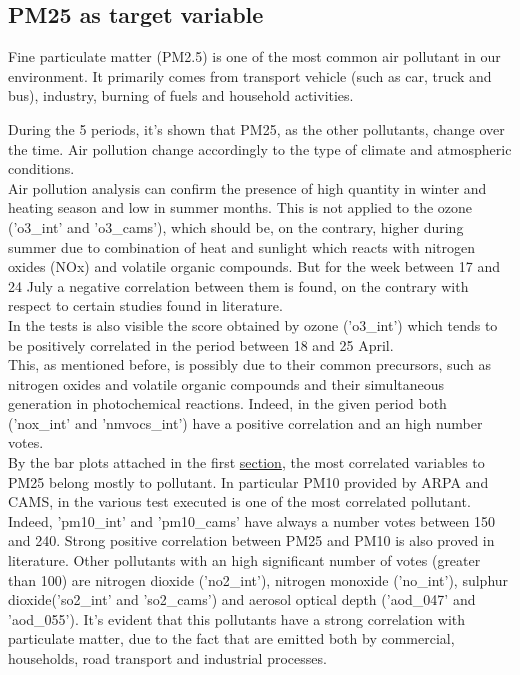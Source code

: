 \subsection{PM25 as target variable}
Fine particulate matter (PM2.5) is one of the most common air pollutant in our environment. 
It primarily comes from transport vehicle (such as car, truck and bus), industry, burning of fuels and household activities.\\ \par
During the 5 periods, it's shown that PM25, as the other pollutants, change over the time. Air pollution change accordingly to the type of climate and atmospheric conditions.\\
Air pollution analysis can confirm the presence of high quantity in winter and heating season and low in summer months\cite{cichowicz2017dispersion}. This is not applied to the ozone ('o3\_int' and 'o3\_cams'), which should be, on the contrary, higher during summer due to combination of heat and sunlight which reacts with nitrogen oxides (NOx) and volatile organic compounds. But for the week between 17 and 24 July a negative correlation between them is found, on the contrary with respect to certain studies found in literature\cite{zhu2019correlations}\cite{biglari2017relationship}.\\
In the tests is also visible the score obtained by ozone ('o3\_int') which tends to be positively correlated in the period between 18 and 25 April.\\
This, as mentioned before, is possibly due to their common precursors, such as nitrogen oxides and volatile organic compounds and their simultaneous generation in photochemical reactions. Indeed, in the given period both ('nox\_int' and 'nmvocs\_int') have a positive correlation and an high number votes.\\
By the bar plots attached in the first \hyperref[sec:pm25]{section}, the most correlated variables to PM25 belong mostly to pollutant. In particular PM10 provided by ARPA and CAMS, in the various test executed is one of the most correlated pollutant. Indeed, 'pm10\_int' and 'pm10\_cams' have always a number votes between 150 and 240. Strong positive correlation between PM25 and PM10 is also proved in literature\cite{zhou2016concentrations}. 
Other pollutants with an high significant number of votes (greater than 100) are nitrogen dioxide ('no2\_int'), nitrogen monoxide ('no\_int'), sulphur dioxide('so2\_int' and 'so2\_cams') and aerosol optical depth ('aod\_047' and 'aod\_055'). It's evident that this pollutants have a strong correlation with particulate matter, due to the fact that are emitted both by commercial, households, road transport and industrial processes\cite{maranzano2022air}.
